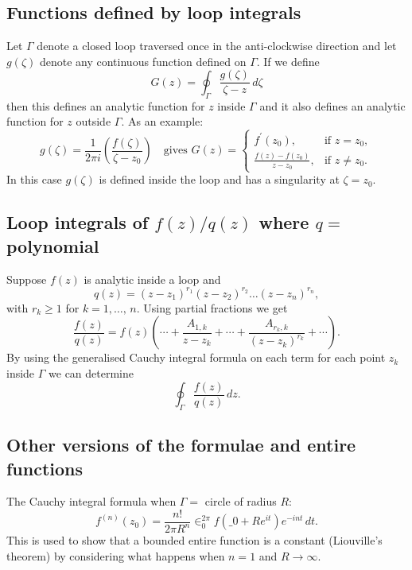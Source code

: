 \documentclass{article}
\begin{document}
\subsection{Functions defined by loop integrals}
Let $\Gamma$ denote a closed loop traversed once in the anti-clockwise direction and let $g(\zeta)$ denote any continuous function defined on $\Gamma$. If we define
\begin{equation}
    G(z) = \oint_{\Gamma} \frac{g(\zeta)}{\zeta - z}\,d\zeta
\end{equation}
then this defines an analytic function for $z$ inside $\Gamma$ and it also defines an analytic function for $z$ outside $\Gamma$. As an example:
\begin{equation}
    g(\zeta) = \frac{1}{2\pi i}\left( \frac{f(\zeta)}{\zeta-z_0} \right)\quad\text{gives }G(z) = \left\{ \begin{array}{lc}
        f^\prime(z_0), & \text{if } z=z_0, \\
        \frac{f(z) - f(z_0)}{z-z_0}, & \text{if } z\neq z_0. 
    \end{array} \right.
\end{equation}
In this case $g(\zeta)$ is defined inside the loop and has a singularity at $\zeta = z_0$.


\subsection{Loop integrals of $f(z)/q(z)$ where $q=$polynomial}
Suppose $f(z)$ is analytic inside a loop and
\begin{equation}
    q(z) = (z-z_1)^{r_1}(z-z_2)^{r_2}\ldots(z-z_n)^{r_n},\nonumber
\end{equation}
with $r_k\geq1$ for $k = 1,\ldots,\,n$. Using partial fractions we get
\begin{equation}
    \frac{f(z)}{q(z)} = f(z)\left( \cdots + \frac{A_{1,k}}{z-z_k} + \cdots + \frac{A_{r_k,k}}{(z-z_k)^{r_k}} + \cdots \right).
\end{equation}
By using the generalised Cauchy integral formula on each term for each point $z_k$ inside $\Gamma$ we can determine
\begin{equation}
    \oint_\Gamma \frac{f(z)}{q(z)}\, dz.
\end{equation}


\subsection{Other versions of the formulae and entire functions}
The Cauchy integral formula when $\Gamma=$ circle of radius $R$:
\begin{equation}
    f^{(n)}(z_0) = \frac{n!}{2\pi R^n}\in_0^{2\pi} f(\_0 + Re^{it})e^{-int}\,dt. 
\end{equation}
This is used to show that a bounded entire function is a constant (Liouville's theorem) by considering what happens when $n=1$ and $R\to\infty$.
\end{document}
